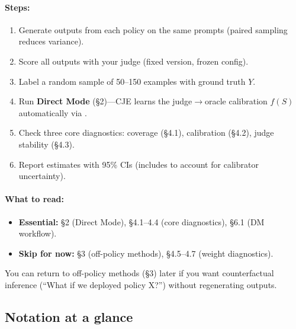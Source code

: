 \paragraph{Steps:}
\begin{enumerate}
\item Generate outputs from each policy on the same prompts (paired sampling reduces variance).
\item Score all outputs with your judge (fixed version, frozen config).
\item Label a random sample of 50--150 examples with ground truth $Y$.
\item Run \textbf{Direct Mode} (§2)---CJE learns the judge$\to$oracle calibration $f(S)$ automatically via \autocal.
\item Check three core diagnostics: coverage (§4.1), calibration (§4.2), judge stability (§4.3).
\item Report estimates with 95\% CIs (includes \oua{} to account for calibrator uncertainty).
\end{enumerate}

\paragraph{What to read:}
\begin{itemize}
\item \textbf{Essential:} §2 (Direct Mode), §4.1--4.4 (core diagnostics), §6.1 (DM workflow).
\item \textbf{Skip for now:} §3 (off-policy methods), §4.5--4.7 (weight diagnostics).
\end{itemize}

You can return to off-policy methods (§3) later if you want counterfactual inference (``What if we deployed policy X?'') without regenerating outputs.

\subsection{Notation at a glance}

